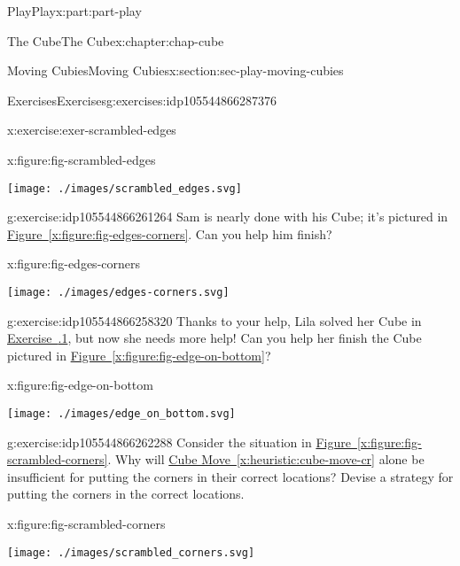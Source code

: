\documentclass[oneside,10pt,]{book}
\newcommand{\xreffont}{\relax}
\numberwithin{equation}{section}
\begin{document}
\begin{partptx}{Play}{}{Play}{}{}{x:part:part-play}
\begin{chapterptx}{The Cube}{}{The Cube}{}{}{x:chapter:chap-cube}
\begin{sectionptx}{Moving Cubies}{}{Moving Cubies}{}{}{x:section:sec-play-moving-cubies}
\begin{exercises-subsection-numberless}{Exercises}{}{Exercises}{}{}{g:exercises:idp105544866287376}
\begin{divisionexercise}{1}{}{}{x:exercise:exer-scrambled-edges}
\begin{figureptx}{}{x:figure:fig-scrambled-edges}{}%
\begin{image}{0.25}{0.5}{0.25}%
\texttt{[image: ./images/scrambled\_edges.svg]}
\end{image}%
\tcblower
\end{figureptx}%
\end{divisionexercise}%
\begin{divisionexercise}{2}{}{}{g:exercise:idp105544866261264}%
Sam is nearly done with his Cube; it's pictured in \hyperref[x:figure:fig-edges-corners]{Figure~{\xreffont\ref{x:figure:fig-edges-corners}}}. Can you help him finish?%
\begin{figureptx}{}{x:figure:fig-edges-corners}{}%
\begin{image}{0.25}{0.5}{0.25}%
\texttt{[image: ./images/edges-corners.svg]}
\end{image}%
\tcblower
\end{figureptx}%
\end{divisionexercise}%
\begin{divisionexercise}{3}{}{}{g:exercise:idp105544866258320}%
Thanks to your help, Lila solved her Cube in \hyperlink{x:exercise:exer-scrambled-edges}{Exercise~{\xreffont 1.3.1}}, but now she needs more help! Can you help her finish the Cube pictured in \hyperref[x:figure:fig-edge-on-bottom]{Figure~{\xreffont\ref{x:figure:fig-edge-on-bottom}}}?%
\begin{figureptx}{}{x:figure:fig-edge-on-bottom}{}%
\begin{image}{0.25}{0.5}{0.25}%
\texttt{[image: ./images/edge\_on\_bottom.svg]}
\end{image}%
\tcblower
\end{figureptx}%
\end{divisionexercise}%
\begin{divisionexercise}{4}{}{}{g:exercise:idp105544866262288}%
Consider the situation in \hyperref[x:figure:fig-scrambled-corners]{Figure~{\xreffont\ref{x:figure:fig-scrambled-corners}}}. Why will \hyperref[x:heuristic:cube-move-cr]{Cube Move~{\xreffont\ref{x:heuristic:cube-move-cr}}} alone be insufficient for putting the corners in their correct locations? Devise a strategy for putting the corners in the correct locations.%
\begin{figureptx}{}{x:figure:fig-scrambled-corners}{}%
\begin{image}{0.25}{0.5}{0.25}%
\texttt{[image: ./images/scrambled\_corners.svg]}

\end{image}
\end{figureptx}
\end{divisionexercise}
\end{exercises-subsection-numberless}
\end{sectionptx}
\end{chapterptx}
\end{partptx}
\end{document}
